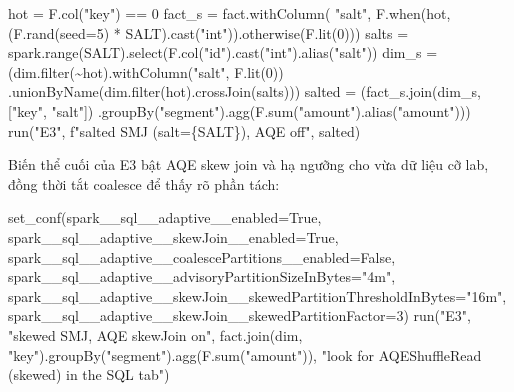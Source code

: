 \documentclass[
  12pt,
  a4paper,
]{article}
\newenvironment{Shaded}{}{}
\newcommand{\BuiltInTok}[1]{\textcolor[rgb]{0.00,0.50,0.00}{#1}}
\newcommand{\DecValTok}[1]{\textcolor[rgb]{0.25,0.63,0.44}{#1}}
\newcommand{\NormalTok}[1]{#1}
\newcommand{\OperatorTok}[1]{\textcolor[rgb]{0.40,0.40,0.40}{#1}}
\newcommand{\SpecialCharTok}[1]{\textcolor[rgb]{0.25,0.44,0.63}{#1}}
\newcommand{\SpecialStringTok}[1]{\textcolor[rgb]{0.73,0.40,0.53}{#1}}
\newcommand{\StringTok}[1]{\textcolor[rgb]{0.25,0.44,0.63}{#1}}
\newcommand{\VariableTok}[1]{\textcolor[rgb]{0.10,0.09,0.49}{#1}}
\begin{document}
\begin{Shaded}
\begin{Highlighting}[]
\NormalTok{hot }\OperatorTok{=}\NormalTok{ F.col(}\StringTok{"key"}\NormalTok{) }\OperatorTok{==} \DecValTok{0}
\NormalTok{fact\_s }\OperatorTok{=}\NormalTok{ fact.withColumn(}
    \StringTok{"salt"}\NormalTok{, F.when(hot, (F.rand(seed}\OperatorTok{=}\DecValTok{5}\NormalTok{) }\OperatorTok{*}\NormalTok{ SALT).cast(}\StringTok{"int"}\NormalTok{)).otherwise(F.lit(}\DecValTok{0}\NormalTok{)))}
\NormalTok{salts }\OperatorTok{=}\NormalTok{ spark.}\BuiltInTok{range}\NormalTok{(SALT).select(F.col(}\StringTok{"id"}\NormalTok{).cast(}\StringTok{"int"}\NormalTok{).alias(}\StringTok{"salt"}\NormalTok{))}
\NormalTok{dim\_s }\OperatorTok{=}\NormalTok{ (dim.}\BuiltInTok{filter}\NormalTok{(}\OperatorTok{\textasciitilde{}}\NormalTok{hot).withColumn(}\StringTok{"salt"}\NormalTok{, F.lit(}\DecValTok{0}\NormalTok{))}
\NormalTok{         .unionByName(dim.}\BuiltInTok{filter}\NormalTok{(hot).crossJoin(salts)))}
\NormalTok{salted }\OperatorTok{=}\NormalTok{ (fact\_s.join(dim\_s, [}\StringTok{"key"}\NormalTok{, }\StringTok{"salt"}\NormalTok{])}
\NormalTok{          .groupBy(}\StringTok{"segment"}\NormalTok{).agg(F.}\BuiltInTok{sum}\NormalTok{(}\StringTok{"amount"}\NormalTok{).alias(}\StringTok{"amount"}\NormalTok{)))}
\NormalTok{run(}\StringTok{"E3"}\NormalTok{, }\SpecialStringTok{f"salted SMJ (salt=}\SpecialCharTok{\{}\NormalTok{SALT}\SpecialCharTok{\}}\SpecialStringTok{), AQE off"}\NormalTok{, salted)}
\end{Highlighting}
\end{Shaded}

Biến thể cuối của E3 bật AQE skew join và hạ ngưỡng cho vừa dữ liệu cỡ
lab, đồng thời tắt coalesce để thấy rõ phần tách:

\begin{Shaded}
\begin{Highlighting}[]
\NormalTok{set\_conf(spark\_\_sql\_\_adaptive\_\_enabled}\OperatorTok{=}\VariableTok{True}\NormalTok{,}
\NormalTok{         spark\_\_sql\_\_adaptive\_\_skewJoin\_\_enabled}\OperatorTok{=}\VariableTok{True}\NormalTok{,}
\NormalTok{         spark\_\_sql\_\_adaptive\_\_coalescePartitions\_\_enabled}\OperatorTok{=}\VariableTok{False}\NormalTok{,}
\NormalTok{         spark\_\_sql\_\_adaptive\_\_advisoryPartitionSizeInBytes}\OperatorTok{=}\StringTok{"4m"}\NormalTok{,}
\NormalTok{         spark\_\_sql\_\_adaptive\_\_skewJoin\_\_skewedPartitionThresholdInBytes}\OperatorTok{=}\StringTok{"16m"}\NormalTok{,}
\NormalTok{         spark\_\_sql\_\_adaptive\_\_skewJoin\_\_skewedPartitionFactor}\OperatorTok{=}\DecValTok{3}\NormalTok{)}
\NormalTok{run(}\StringTok{"E3"}\NormalTok{, }\StringTok{"skewed SMJ, AQE skewJoin on"}\NormalTok{,}
\NormalTok{    fact.join(dim, }\StringTok{"key"}\NormalTok{).groupBy(}\StringTok{"segment"}\NormalTok{).agg(F.}\BuiltInTok{sum}\NormalTok{(}\StringTok{"amount"}\NormalTok{)),}
    \StringTok{"look for AQEShuffleRead (skewed) in the SQL tab"}\NormalTok{)}
\end{Highlighting}
\end{Shaded}
\end{document}

